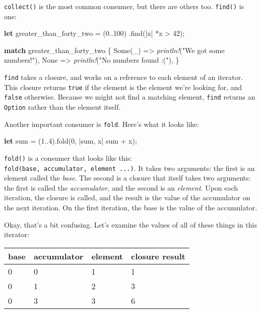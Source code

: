 \documentclass[a4paper,]{book}
\newenvironment{Shaded}{\begin{snugshade}}{\end{snugshade}}
\newcommand{\KeywordTok}[1]{\textcolor[rgb]{0.13,0.29,0.53}{\textbf{{#1}}}}
\newcommand{\DecValTok}[1]{\textcolor[rgb]{0.00,0.00,0.81}{{#1}}}
\newcommand{\ConstantTok}[1]{\textcolor[rgb]{0.00,0.00,0.00}{{#1}}}
\newcommand{\StringTok}[1]{\textcolor[rgb]{0.31,0.60,0.02}{{#1}}}
\newcommand{\PreprocessorTok}[1]{\textcolor[rgb]{0.56,0.35,0.01}{\textit{{#1}}}}
\newcommand{\NormalTok}[1]{{#1}}
\begin{document}
\texttt{collect()} is the most common consumer, but there are others
too. \texttt{find()} is one:

\begin{Shaded}
\begin{Highlighting}[]
\KeywordTok{let} \NormalTok{greater_than_forty_two = (}\DecValTok{0.}\NormalTok{.}\DecValTok{100}\NormalTok{)}
                             \NormalTok{.find(|x| *x > }\DecValTok{42}\NormalTok{);}

\KeywordTok{match} \NormalTok{greater_than_forty_two \{}
    \ConstantTok{Some}\NormalTok{(_) => }\PreprocessorTok{println!}\NormalTok{(}\StringTok{"We got some numbers!"}\NormalTok{),}
    \ConstantTok{None} \NormalTok{=> }\PreprocessorTok{println!}\NormalTok{(}\StringTok{"No numbers found :("}\NormalTok{),}
\NormalTok{\}}
\end{Highlighting}
\end{Shaded}

\texttt{find} takes a closure, and works on a reference to each element
of an iterator. This closure returns \texttt{true} if the element is the
element we're looking for, and \texttt{false} otherwise. Because we
might not find a matching element, \texttt{find} returns an
\texttt{Option} rather than the element itself.

Another important consumer is \texttt{fold}. Here's what it looks like:

\begin{Shaded}
\begin{Highlighting}[]
\KeywordTok{let} \NormalTok{sum = (}\DecValTok{1.}\NormalTok{.}\DecValTok{4}\NormalTok{).fold(}\DecValTok{0}\NormalTok{, |sum, x| sum + x);}
\end{Highlighting}
\end{Shaded}

\texttt{fold()} is a consumer that looks like this:
\texttt{fold(base,\ \textbar{}accumulator,\ element\textbar{}\ ...)}. It
takes two arguments: the first is an element called the \emph{base}. The
second is a closure that itself takes two arguments: the first is called
the \emph{accumulator}, and the second is an \emph{element}. Upon each
iteration, the closure is called, and the result is the value of the
accumulator on the next iteration. On the first iteration, the base is
the value of the accumulator.

Okay, that's a bit confusing. Let's examine the values of all of these
things in this iterator:

\begin{longtable}[c]{@{}llll@{}}
\toprule
base & accumulator & element & closure result\tabularnewline
\midrule
\endhead
0 & 0 & 1 & 1\tabularnewline
0 & 1 & 2 & 3\tabularnewline
0 & 3 & 3 & 6\tabularnewline
\bottomrule
\end{longtable}
\end{document}
